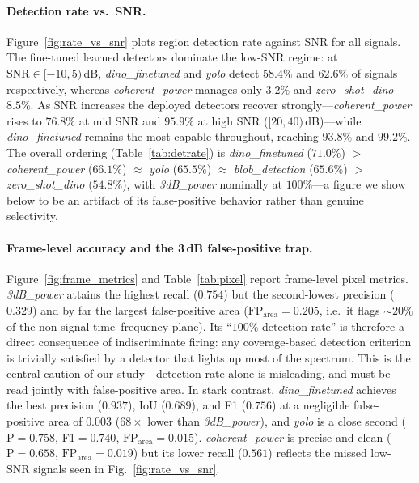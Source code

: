 \paragraph{Detection rate vs.\ SNR.}
Figure~\ref{fig:rate_vs_snr} plots region detection rate against SNR for all signals.
The fine-tuned learned detectors dominate the low-SNR regime: at
$\mathrm{SNR}\in[-10,5)$\,dB, \emph{dino\_finetuned} and \emph{yolo} detect
$58.4\%$ and $62.6\%$ of signals respectively, whereas \emph{coherent\_power} manages
only $3.2\%$ and \emph{zero\_shot\_dino} $8.5\%$. As SNR increases the deployed
detectors recover strongly---\emph{coherent\_power} rises to $76.8\%$ at mid SNR and
$95.9\%$ at high SNR ($[20,40)$\,dB)---while \emph{dino\_finetuned} remains the most
capable throughout, reaching $93.8\%$ and $99.2\%$. The overall ordering
(Table~\ref{tab:detrate}) is \emph{dino\_finetuned} ($71.0\%$) $>$
\emph{coherent\_power} ($66.1\%$) $\approx$ \emph{yolo} ($65.5\%$) $\approx$
\emph{blob\_detection} ($65.6\%$) $>$ \emph{zero\_shot\_dino} ($54.8\%$), with
\emph{3dB\_power} nominally at $100\%$---a figure we show below to be an artifact of
its false-positive behavior rather than genuine selectivity.

\paragraph{Frame-level accuracy and the 3\,dB false-positive trap.}
Figure~\ref{fig:frame_metrics} and Table~\ref{tab:pixel} report frame-level pixel
metrics. \emph{3dB\_power} attains the highest recall ($0.754$) but the second-lowest
precision ($0.329$) and by far the largest false-positive area
($\mathrm{FP}_{\text{area}}=0.205$, i.e.\ it flags $\sim\!20\%$ of the non-signal
time--frequency plane). Its ``$100\%$ detection rate'' is therefore a direct
consequence of indiscriminate firing: any coverage-based detection criterion is
trivially satisfied by a detector that lights up most of the spectrum. This is the
central caution of our study---detection rate alone is misleading, and must be read
jointly with false-positive area. In stark contrast, \emph{dino\_finetuned} achieves
the best precision ($0.937$), IoU ($0.689$), and F1 ($0.756$) at a negligible
false-positive area of $0.003$ ($68\times$ lower than \emph{3dB\_power}), and
\emph{yolo} is a close second ($\mathrm{P}=0.758$, F1$=0.740$,
$\mathrm{FP}_{\text{area}}=0.015$). \emph{coherent\_power} is precise and clean
($\mathrm{P}=0.658$, $\mathrm{FP}_{\text{area}}=0.019$) but its lower recall ($0.561$)
reflects the missed low-SNR signals seen in Fig.~\ref{fig:rate_vs_snr}.

